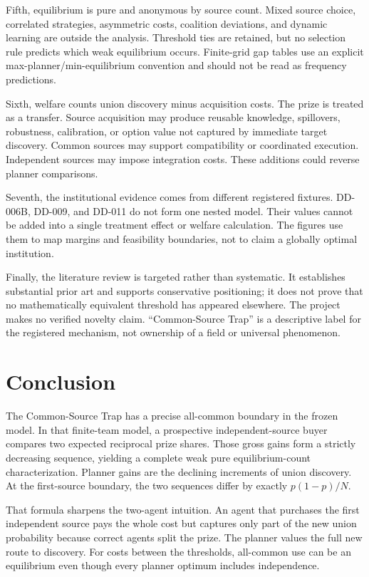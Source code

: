 \documentclass[11pt]{article}
\begin{document}
Fifth, equilibrium is pure and anonymous by source count. Mixed source choice,
correlated strategies, asymmetric costs, coalition deviations, and dynamic
learning are outside the analysis. Threshold ties are retained, but no selection
rule predicts which weak equilibrium occurs. Finite-grid gap tables use an
explicit max-planner/min-equilibrium convention and should not be read as
frequency predictions.

Sixth, welfare counts union discovery minus acquisition costs. The prize is
treated as a transfer. Source acquisition may produce reusable knowledge,
spillovers, robustness, calibration, or option value not captured by immediate
target discovery. Common sources may support compatibility or coordinated
execution. Independent sources may impose integration costs. These additions
could reverse planner comparisons.

Seventh, the institutional evidence comes from different registered fixtures.
DD-006B, DD-009, and DD-011 do not form one nested model. Their values cannot be
added into a single treatment effect or welfare calculation. The figures use
them to map margins and feasibility boundaries, not to claim a globally optimal
institution.

Finally, the literature review is targeted rather than systematic. It establishes
substantial prior art and supports conservative positioning; it does not prove
that no mathematically equivalent threshold has appeared elsewhere. The project
makes no verified novelty claim. ``Common-Source Trap'' is a descriptive label
for the registered mechanism, not ownership of a field or universal phenomenon.

\section{Conclusion}

The Common-Source Trap has a precise all-common boundary in the frozen model.
In that finite-team model, a prospective independent-source buyer compares two
expected reciprocal
prize shares. Those gross gains form a strictly decreasing sequence, yielding a
complete weak pure equilibrium-count characterization. Planner gains are the
declining increments of union discovery. At the first-source boundary, the two
sequences differ by exactly $p(1-p)/N$.

That formula sharpens the two-agent intuition. An agent that purchases the first
independent source pays the whole cost but captures only part of the new union
probability because correct agents split the prize. The planner values the full
new route to discovery. For costs between the thresholds, all-common use can be
an equilibrium even though every planner optimum includes independence.
\end{document}
